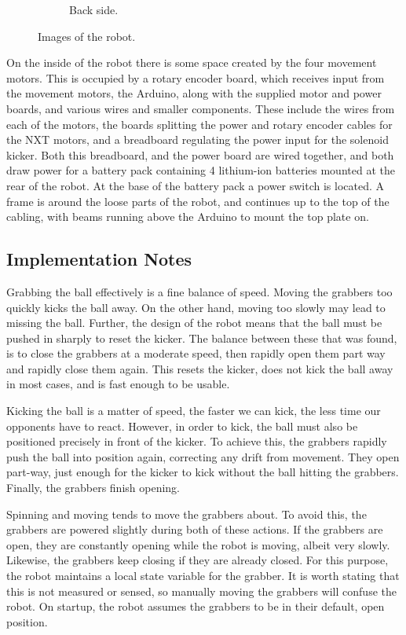 \begin{figure}[!tbp]
\begin{subfigure}[b]{0.4\textwidth}
    \caption{Back side.}
    \label{fig:f2}
  \end{subfigure}
  \caption{Images of the robot.}
\end{figure}

On the inside of the robot there is some space created by the four movement
motors. This is occupied by a rotary encoder board, which receives input from
the movement motors, the Arduino, along with the supplied motor and power
boards, and various wires and smaller components. These include the wires from
each of the motors, the boards splitting the power and rotary encoder cables
for the NXT motors, and a breadboard regulating the power input for the
solenoid kicker. Both this breadboard, and the power board are wired together,
and both draw power for a battery pack containing 4 lithium-ion batteries
mounted at the rear of the robot. At the base of the battery pack a power
switch is located. A frame is around the loose parts of the robot, and
continues up to the top of the cabling, with beams running above the Arduino to
mount the top plate on.

\subsection{Implementation Notes}

Grabbing the ball effectively is a fine balance of speed. Moving the grabbers
too quickly kicks the ball away. On the other hand, moving too slowly may lead
to missing the ball. Further, the design of the robot means that the ball must
be pushed in sharply to reset the kicker. The balance between these that was
found, is to close the grabbers at a moderate speed, then rapidly open them
part way and rapidly close them again. This resets the kicker, does not kick
the ball away in most cases, and is fast enough to be usable.

Kicking the ball is a matter of speed, the faster we can kick, the less time
our opponents have to react. However, in order to kick, the ball must also be
positioned precisely in front of the kicker. To achieve this, the grabbers
rapidly push the ball into position again, correcting any drift from movement.
They open part-way, just enough for the kicker to kick without the ball
hitting the grabbers. Finally, the grabbers finish opening.

Spinning and moving tends to move the grabbers about. To avoid this, the
grabbers are powered slightly during both of these actions. If the grabbers are
open, they are constantly opening while the robot is moving, albeit very
slowly. Likewise, the grabbers keep closing if they are already closed. For
this purpose, the robot maintains a local state variable for the grabber. It is
worth stating that this is not measured or sensed, so manually moving the
grabbers will confuse the robot. On startup, the robot assumes the grabbers to
be in their default, open position.
